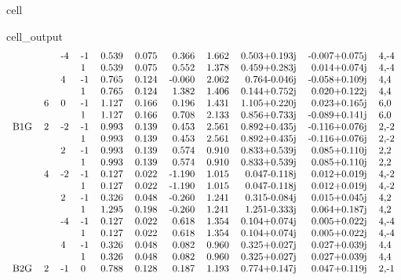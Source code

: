 \documentclass[letterpaper,table,10pt,english]{jupyterBook}
\begin{document}
\begin{sphinxuseclass}{cell}
\begin{sphinxVerbatimOutput}
\begin{sphinxuseclass}{cell_output}
\begin{equation*}
\begin{split}
\begin{tabular}{llllrrrrrrl}
    &   & -4 & -1 &  0.539 &  0.075 &  0.366 &  1.662 &  0.503+0.193j & -0.007+0.075j &   4,-4 \\
    &   &    &  1 &  0.539 &  0.075 &  0.552 &  1.378 &  0.459+0.283j &  0.014+0.074j &   4,-4 \\
    &   &  4 & -1 &  0.765 &  0.124 & -0.060 &  2.062 &  0.764-0.046j & -0.058+0.109j &    4,4 \\
    &   &    &  1 &  0.765 &  0.124 &  1.382 &  1.406 &  0.144+0.752j &  0.020+0.122j &    4,4 \\
    & 6 &  0 & -1 &  1.127 &  0.166 &  0.196 &  1.431 &  1.105+0.220j &  0.023+0.165j &    6,0 \\
    &   &    &  1 &  1.127 &  0.166 &  0.708 &  2.133 &  0.856+0.733j & -0.089+0.141j &    6,0 \\
B1G & 2 & -2 & -1 &  0.993 &  0.139 &  0.453 &  2.561 &  0.892+0.435j & -0.116+0.076j &   2,-2 \\
    &   &    &  1 &  0.993 &  0.139 &  0.453 &  2.561 &  0.892+0.435j & -0.116+0.076j &   2,-2 \\
    &   &  2 & -1 &  0.993 &  0.139 &  0.574 &  0.910 &  0.833+0.539j &  0.085+0.110j &    2,2 \\
    &   &    &  1 &  0.993 &  0.139 &  0.574 &  0.910 &  0.833+0.539j &  0.085+0.110j &    2,2 \\
    & 4 & -2 & -1 &  0.127 &  0.022 & -1.190 &  1.015 &  0.047-0.118j &  0.012+0.019j &   4,-2 \\
    &   &    &  1 &  0.127 &  0.022 & -1.190 &  1.015 &  0.047-0.118j &  0.012+0.019j &   4,-2 \\
    &   &  2 & -1 &  0.326 &  0.048 & -0.260 &  1.241 &  0.315-0.084j &  0.015+0.045j &    4,2 \\
    &   &    &  1 &  1.295 &  0.198 & -0.260 &  1.241 &  1.251-0.333j &  0.064+0.187j &    4,2 \\
    &   & -4 & -1 &  0.127 &  0.022 &  0.618 &  1.354 &  0.104+0.074j &  0.005+0.022j &   4,-4 \\
    &   &    &  1 &  0.127 &  0.022 &  0.618 &  1.354 &  0.104+0.074j &  0.005+0.022j &   4,-4 \\
    &   &  4 & -1 &  0.326 &  0.048 &  0.082 &  0.960 &  0.325+0.027j &  0.027+0.039j &    4,4 \\
    &   &    &  1 &  0.326 &  0.048 &  0.082 &  0.960 &  0.325+0.027j &  0.027+0.039j &    4,4 \\
B2G & 2 & -1 &  0 &  0.788 &  0.128 &  0.187 &  1.193 &  0.774+0.147j &  0.047+0.119j &   2,-1 \\

\end{tabular}
\end{split}
\end{equation*}
\end{sphinxuseclass}
\end{sphinxVerbatimOutput}
\end{sphinxuseclass}
\end{document}

